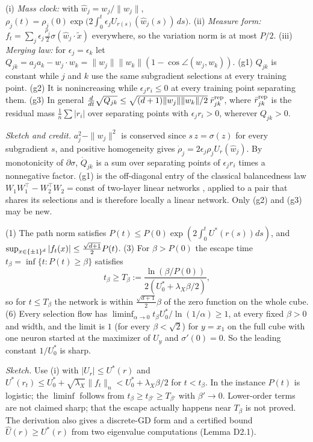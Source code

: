 \begin{lemma}[Lemma D1(b), (c), (g)]\label{lem:D1}
(i) \emph{Mass clock:} with $\hat w_j=w_j/\|w_j\|$, $\rho_j(t)=\rho_j(0)\exp\bigl(2\int_0^t\epsilon_jU_{r(s)}(\hat w_j(s))\,ds\bigr)$.
(ii) \emph{Measure form:} $f_t=\sum_j\epsilon_j\frac{\rho_j}2\sigma(\hat w_j\cdot\tilde x)$ everywhere, so the variation norm is at most $P/2$.
(iii) \emph{Merging law:} for $\epsilon_j=\epsilon_k$ let $Q_{jk}=a_ja_k-w_j\cdot w_k=\|w_j\|\|w_k\|(1-\cos\angle(w_j,w_k))$. (g1) $Q_{jk}$ is constant while $j$ and $k$ use the same subgradient selections at every training point. (g2) It is nonincreasing while $\epsilon_jr_i\le0$ at every training point separating them. (g3) In general $\frac d{dt}\sqrt{Q_{jk}}\le\sqrt{(d+1)\|w_j\|\|w_k\|/2}\;\bar r^{\rm rep}_{jk}$, where $\bar r^{\rm rep}_{jk}$ is the residual mass $\frac1n\sum|r_i|$ over separating points with $\epsilon_jr_i>0$, wherever $Q_{jk}>0$.
\end{lemma}
\noindent\emph{Sketch and credit.} $a_j^2-\|w_j\|^2$ is conserved since $s\,z=\sigma(z)$ for every subgradient $s$, and positive homogeneity gives $\dot\rho_j=2\epsilon_j\rho_jU_r(\hat w_j)$. By monotonicity of $\partial\sigma$, $\dot Q_{jk}$ is a sum over separating points of $\epsilon_jr_i$ times a nonnegative factor. (g1) is the off-diagonal entry of the classical balancedness law $W_1W_1^\top-W_2^\top W_2=\text{const}$ of two-layer linear networks \cite{arora2018optimization,du2018algorithmic}, applied to a pair that shares its selections and is therefore locally a linear network. Only (g2) and (g3) may be new.

\begin{theorem}\label{thm:D2}
(1) The path norm satisfies $P(t)\le P(0)\exp(2\int_0^tU^*(r(s))ds)$, and $\sup_{x\in\{\pm1\}^d}|f_t(x)|\le\frac{\sqrt{d+1}}2P(t)$.
(3) For $\beta>P(0)$ the escape time $t_\beta=\inf\{t:P(t)\ge\beta\}$ satisfies
\[
t_\beta\ge T_\beta:=\frac{\ln(\beta/P(0))}{2(U_0^*+\lambda_X\beta/2)},
\]
so for $t\le T_\beta$ the network is within $\frac{\sqrt{d+1}}2\beta$ of the zero function on the whole cube.
(6) Every selection flow has $\liminf_{\alpha\to0}t_\beta U_0^*/\ln(1/\alpha)\ge1$, at every fixed $\beta>0$ and width, and the limit is $1$ (for every $\beta<\sqrt2$) for $y=x_1$ on the full cube with one neuron started at the maximizer of $U_y$ and $\sigma'(0)=0$. So the leading constant $1/U_0^*$ is sharp.
\end{theorem}
\noindent\emph{Sketch.} Use (i) with $|U_r|\le U^*(r)$ and $U^*(r_t)\le U_0^*+\sqrt{\lambda_X}\|f_t\|_n<U_0^*+\lambda_X\beta/2$ for $t<t_\beta$. In the instance $P(t)$ is logistic; the $\liminf$ follows from $t_\beta\ge t_{\beta'}\ge T_{\beta'}$ with $\beta'\to0$. Lower-order terms are not claimed sharp; that the escape actually happens near $T_\beta$ is not proved. The derivation also gives a discrete-GD form and a certified bound $\hat U(r)\ge U^*(r)$ from two eigenvalue computations (Lemma D2.1).

